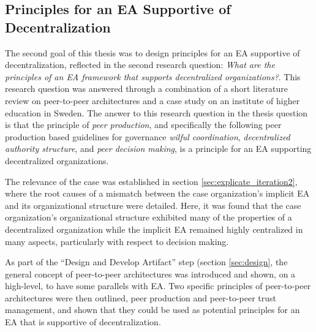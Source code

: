 \subsection{Principles for an EA Supportive of Decentralization}

The second goal of this thesis was to design principles for an EA supportive of decentralization, reflected in the second research question: \textit{What are the principles of an EA framework that supports decentralized organizations?}.  This research question was answered through a combination of a short literature review on peer-to-peer architectures and a case study on an institute of higher education in Sweden. The answer to this research question in the thesis question is that the principle of \textit{peer production}, and specifically the following peer production based guidelines for governance \textit{wilful coordination}, \textit{decentralized authority structure}, and \textit{peer decision making}, is a principle for an EA supporting decentralized organizations. 

The relevance of the case was established in section \ref{sec:explicate_iteration2}, where the root causes of a mismatch between the case organization's implicit EA and its organizational structure were detailed. Here, it was found that the case organization's organizational structure exhibited many of the properties of a decentralized organization while the implicit EA remained highly centralized in many aspects, particularly with respect to decision making. 

As part of the ``Design and Develop Artifact'' step (section \ref{sec:design}, the general concept of peer-to-peer architectures was introduced and shown, on a high-level, to have some parallels with EA. Two specific principles of peer-to-peer architectures were then outlined, peer production and peer-to-peer trust management, and shown that they could be used as potential principles for an EA that is supportive of decentralization. 

